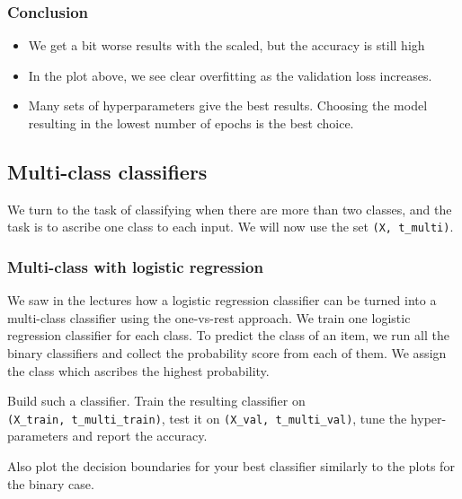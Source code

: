 \documentclass[a4paper,landscape]{article}
\providecommand{\tightlist}{%
      \setlength{\itemsep}{0pt}\setlength{\parskip}{0pt}}
\begin{document}
    \subsubsection{Conclusion}\label{conclusion}

\begin{itemize}
\tightlist
\item
  We get a bit worse results with the scaled, but the accuracy is still
  high
\item
  In the plot above, we see clear overfitting as the validation loss
  increases.
\item
  Many sets of hyperparameters give the best results. Choosing the model
  resulting in the lowest number of epochs is the best choice.
\end{itemize}

    \subsection{Multi-class classifiers}\label{multi-class-classifiers}

We turn to the task of classifying when there are more than two classes,
and the task is to ascribe one class to each input. We will now use the
set \texttt{(X,\ t\_multi)}.

    \subsubsection{Multi-class with logistic
regression}\label{multi-class-with-logistic-regression}

We saw in the lectures how a logistic regression classifier can be
turned into a multi-class classifier using the one-vs-rest approach. We
train one logistic regression classifier for each class. To predict the
class of an item, we run all the binary classifiers and collect the
probability score from each of them. We assign the class which ascribes
the highest probability.

Build such a classifier. Train the resulting classifier on
\texttt{(X\_train,\ t\_multi\_train)}, test it on
\texttt{(X\_val,\ t\_multi\_val)}, tune the hyper-parameters and report
the accuracy.

Also plot the decision boundaries for your best classifier similarly to
the plots for the binary case.
\end{document}
